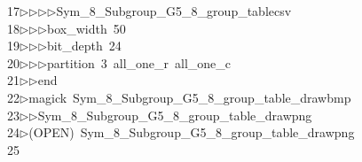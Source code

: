 \begin{tabbing}
17\>$\triangleright$\>$\triangleright$\>$\triangleright$\>$\triangleright$\>Sym\_8\_Subgroup\_G5\_8\_group\_tablecsv\ \\[0pt]
18\>$\triangleright$\>$\triangleright$\>$\triangleright$\>box\_width\ 50\ \\[0pt]
19\>$\triangleright$\>$\triangleright$\>$\triangleright$\>bit\_depth\ 24\ \\[0pt]
20\>$\triangleright$\>$\triangleright$\>$\triangleright$\>partition\ 3\ all\_one\_r\ all\_one\_c\ \\[0pt]
21\>$\triangleright$\>$\triangleright$\>end\\[0pt]
22\>$\triangleright$\>magick\ Sym\_8\_Subgroup\_G5\_8\_group\_table\_drawbmp\ \\[0pt]
23\>$\triangleright$\>$\triangleright$\>Sym\_8\_Subgroup\_G5\_8\_group\_table\_drawpng\\[0pt]
24\>$\triangleright$\>(OPEN)\ Sym\_8\_Subgroup\_G5\_8\_group\_table\_drawpng\\[0pt]
25\>\end{tabbing}
